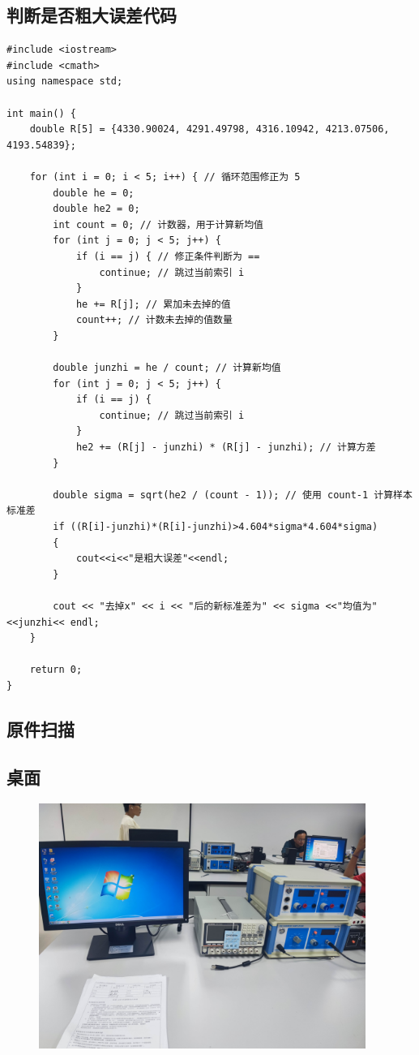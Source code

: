 \documentclass[dvipsnames, svgnames,a4paper,11pt]{article}
\begin{document}
\subsection*{判断是否粗大误差代码}
\begin{lstlisting}[caption={}]
#include <iostream>
#include <cmath>
using namespace std;

int main() { 
    double R[5] = {4330.90024, 4291.49798, 4316.10942, 4213.07506, 4193.54839};
    
    for (int i = 0; i < 5; i++) { // 循环范围修正为 5
        double he = 0;
        double he2 = 0;
        int count = 0; // 计数器，用于计算新均值
        for (int j = 0; j < 5; j++) {
            if (i == j) { // 修正条件判断为 ==
                continue; // 跳过当前索引 i
            }
            he += R[j]; // 累加未去掉的值
            count++; // 计数未去掉的值数量
        }
        
        double junzhi = he / count; // 计算新均值
        for (int j = 0; j < 5; j++) {
            if (i == j) {
                continue; // 跳过当前索引 i
            }
            he2 += (R[j] - junzhi) * (R[j] - junzhi); // 计算方差
        }
        
        double sigma = sqrt(he2 / (count - 1)); // 使用 count-1 计算样本标准差
        if ((R[i]-junzhi)*(R[i]-junzhi)>4.604*sigma*4.604*sigma)
        {
            cout<<i<<"是粗大误差"<<endl;
        }
        
        cout << "去掉x" << i << "后的新标准差为" << sigma <<"均值为"<<junzhi<< endl;
    }
    
    return 0;
}

\end{lstlisting}
%
\subsection*{原件扫描}


\subsection*{桌面}
\begin{figure}[!h]
	\includegraphics[width=0.95\textwidth]{实验5桌面.jpg}
\end{figure}
\end{document}
